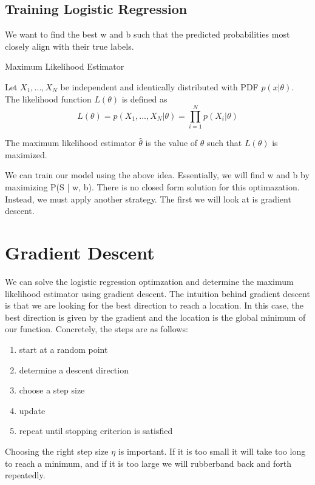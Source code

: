 \subsection*{Training Logistic Regression}
We want to find the best w and b such that the predicted probabilities most closely align with their true labels.

\begin{definition}
    Maximum Likelihood Estimator

    Let $X_1, ..., X_N$ be independent and identically distributed with PDF $p(x|\theta)$. The likelihood function $L(\theta)$ is defined as 
    \[
        L(\theta) = p(X_1, ..., X_N | \theta) = \prod_{i=1}^{N}p(X_i | \theta)
    \]

    The maximum likelihood estimator $\hat{\theta}$ is the value of $\theta$ such that $L(\theta)$ is maximized.
\end{definition}

We can train our model using the above idea. Essentially, we will find w and b by maximizing P(S | w, b). There is no closed form solution for this optimazation. Instead, we must apply another strategy. The first we will look at is gradient descent.

\section{Gradient Descent}
\begin{center}
\end{center}
We can solve the logistic regression optimzation and determine the maximum likelihood estimator using gradient descent. The intuition behind gradient descent is that we are looking for the best direction to reach a location. In this case, the best direction is given by the gradient and the location is the global minimum of our function. Concretely, the steps are as follows:
\begin{enumerate}
    \item start at a random point
    \item determine a descent direction
    \item choose a step size
    \item update
    \item repeat until stopping criterion is satisfied
\end{enumerate}


Choosing the right step size $\eta$ is important. If it is too small it will take too long to reach a minimum, and if it is too large we will rubberband back and forth repeatedly.
\begin{center}
\end{center}